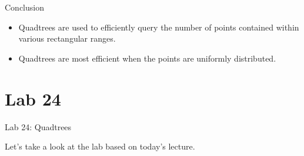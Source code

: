 \documentclass[14pt,aspectratio=1610]{beamer}
\begin{document}
\begin{frame}{Conclusion}
\begin{itemize}
  \item
    Quadtrees are used to efficiently query the number of points contained within various rectangular ranges.
  \item
    Quadtrees are most efficient when the points are uniformly distributed.
\end{itemize}
\end{frame}




\section*{Lab 24}
\begin{frame}{Lab 24: Quadtrees}
\begin{center}\Large
Let's take a look at the lab based on today's lecture.
\end{center}
\end{frame}
\end{document}
